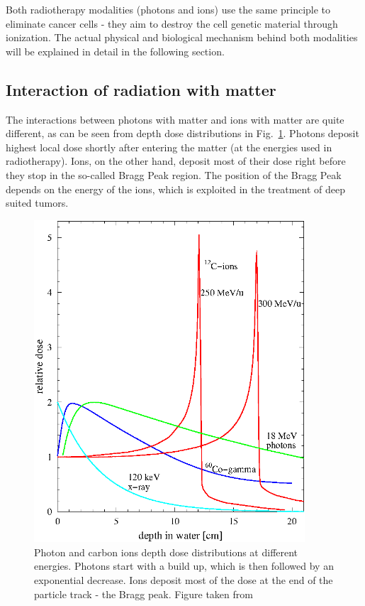 \documentclass[type=dr, dr=rernat, accentcolor=tud7b,colorbacktitle, bigchapter, openright, twoside, 12pt ]{tudthesis}
\begin{document}
Both radiotherapy modalities (photons and ions) use the same principle to eliminate cancer cells - they aim to destroy the cell genetic material through ionization. The actual physical and biological mechanism behind both modalities will be explained in detail in the following section.

\subsection{Interaction of radiation with matter}

The interactions between photons with matter and ions with matter are quite different, as can be seen from depth dose distributions in Fig.~\ref{ddp}. Photons deposit highest local dose shortly after entering the matter (at the energies used in radiotherapy). Ions, on the other hand, deposit most of their dose right before they stop in the so-called Bragg Peak region. The position of the Bragg Peak depends on the energy of the ions, which is exploited in the treatment
of deep suited tumors.

\newpage
 
\vspace*{1cm}
 
\begin{figure}[H]
\begin{center}
\includegraphics[width=0.9\textwidth]{./Images/depthdose.png}
\caption{Photon and carbon ions depth dose distributions at different energies. Photons start with a build up, which is then followed by an exponential decrease. Ions deposit most of the dose at the end of the particle track - the Bragg peak. Figure taken from \cite{Schardt2010} }
\label{ddp}
\end{center}
\end{figure}
\end{document}
